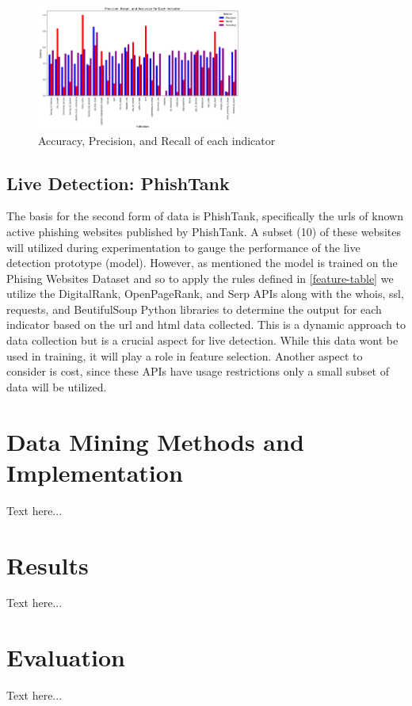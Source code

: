 \documentclass{sigkddExp}
\begin{document}
\begin{figure}[htbp]
  \centering
  \includegraphics[width=0.6\textwidth]{./images/APR.png}
  \caption{Accuracy, Precision, and Recall of each indicator}
  \label{fig:apr}
\end{figure}

\subsection{Live Detection: PhishTank}
The basis for the second form of data is PhishTank, specifically the urls of known active phishing websites published by PhishTank. A subset (10) of these websites will utilized during experimentation to gauge the performance of the live detection prototype (model). However, as mentioned the model is trained on the Phising Websites Dataset and so to apply the rules defined in \ref{feature-table} we utilize the DigitalRank, OpenPageRank, and Serp APIs along with the whois, ssl, requests, and BeutifulSoup Python libraries to determine the output for each indicator based on the url and html data collected. This is a dynamic approach to data collection but is a crucial aspect for live detection. While this data wont be used in training, it will play a role in feature selection. Another aspect to consider is cost, since these APIs have usage restrictions only a small subset of data will be utilized.
 
\section{Data Mining Methods and Implementation}
Text here...

\section{Results}
Text here...

\section{Evaluation}
Text here...
\end{document}
